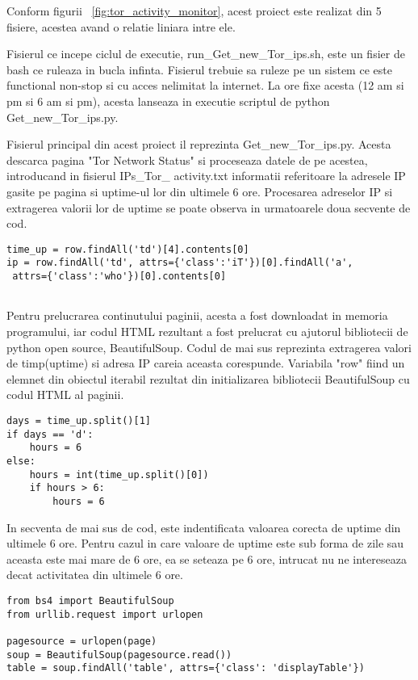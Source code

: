 Conform figurii ~\ref{fig:tor_activity_monitor}, acest proiect este realizat din 5 fisiere, acestea avand o relatie liniara intre ele.

Fisierul ce incepe ciclul de executie, run\_Get\_new\_Tor\_ips.sh, este un fisier de bash ce ruleaza in bucla infinta. Fisierul trebuie sa ruleze pe un sistem ce este functional non-stop si cu acces nelimitat la internet. La ore fixe acesta (12 am si pm si 6 am si pm), acesta lanseaza in executie scriptul de python Get\_new\_Tor\_ips.py.

Fisierul principal din acest proiect il reprezinta Get\_new\_Tor\_ips.py. Acesta descarca pagina "Tor Network Status" \cite{tot_status} si proceseaza datele de pe acestea, introducand in fisierul IPs\_Tor\_ activity.txt informatii referitoare la adresele IP gasite pe pagina si uptime-ul lor din ultimele 6 ore. Procesarea adreselor IP si extragerea valorii lor de uptime se poate observa in urmatoarele doua secvente de cod.

\lstset{language=python,frame=single, showstringspaces=false}
\begin{lstlisting}
time_up = row.findAll('td')[4].contents[0]
ip = row.findAll('td', attrs={'class':'iT'})[0].findAll('a',
 attrs={'class':'who'})[0].contents[0]


\end{lstlisting}

Pentru prelucrarea continutului paginii, acesta a fost downloadat in memoria programului, iar codul HTML rezultant a fost prelucrat cu ajutorul bibliotecii de python open source, BeautifulSoup. Codul de mai sus reprezinta extragerea valori de timp(uptime) si adresa IP careia aceasta corespunde. Variabila "row" fiind un elemnet din obiectul iterabil rezultat din initializarea bibliotecii BeautifulSoup cu codul HTML al paginii.

\lstset{language=python,frame=single, showstringspaces=false}
\begin{lstlisting}
days = time_up.split()[1]
if days == 'd':
    hours = 6
else:
    hours = int(time_up.split()[0])
    if hours > 6:
        hours = 6

\end{lstlisting}

In secventa de mai sus de cod, este indentificata valoarea corecta de uptime din ultimele 6 ore. Pentru cazul in care valoare de uptime este sub forma de zile sau aceasta este mai mare de 6 ore, ea se seteaza pe 6 ore, intrucat nu ne intereseaza decat activitatea din ultimele 6 ore.
\begin{lstlisting}
from bs4 import BeautifulSoup
from urllib.request import urlopen

pagesource = urlopen(page)
soup = BeautifulSoup(pagesource.read())
table = soup.findAll('table', attrs={'class': 'displayTable'})
\end{lstlisting}

